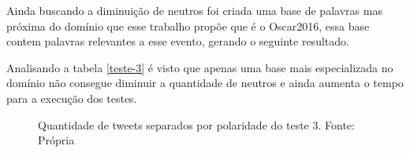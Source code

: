 Ainda buscando a diminuição de neutros foi criada uma base de palavras mas próxima do domínio que esse trabalho propõe que é o Oscar2016, essa base contem palavras relevantes a esse evento, gerando o seguinte resultado.

\begin{table}[]
	\caption{3º teste}
	\label{teste-3}
\end{table}

Analisando a tabela \ref{teste-3} é visto que apenas uma base mais especializada no domínio não consegue diminuir a quantidade de neutros e ainda aumenta o tempo para a execução dos testes.
\begin{figure}[!h]
	\centering{}
	\caption{Quantidade de tweets separados por polaridade do teste 3. Fonte: Própria}
	\label{uni}
\end{figure}

